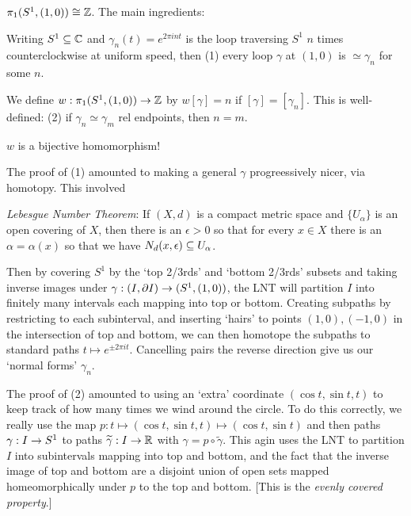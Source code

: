 \documentclass[12pt]{article}
\begin{document}
\msk

$\pi_1(S^1,(1,0))\cong{\mathbb Z}$. The main ingredients:

\ssk

Writing $S^1\subseteq{\mathbb C}$ and $\gamma_n(t)=e^{2\pi int}$ is the loop
traversing $S^1$ $n$ times counterclockwise at uniform speed,
then (1) every loop $\gamma$ at $(1,0)$ is $\simeq\gamma_n$ for some $n$.

\ssk

We define $w:\pi_1(S^1,(1,0))\rightarrow{\mathbb Z}$ by $w[\gamma] = n$ if
$[\gamma]=[\gamma_n]$. This is well-defined:
(2) if $\gamma_n\simeq\gamma_m$ rel endpoints, then $n=m$.

\ssk

$w$ is a bijective homomorphism!

\ssk

The proof of (1) amounted to making a general $\gamma$ progreessively nicer, 
via homotopy. This involved 

\ssk

{\it Lebesgue Number Theorem}: If $(X,d)$ is a compact metric space and
$\{U_\alpha\}$ is an open covering of $X$, then there is an $\epsilon>0$
so that for every $x\in X$ there is an $\alpha=\alpha(x)$ so that 
we have $N_d(x,\epsilon)\subseteq U_\alpha$.

\ssk

Then by covering $S^1$ by the `top 2/3rds' and `bottom 2/3rds' subsets
and taking inverse images under $\gamma:(I,\partial I)\rightarrow (S^1,(1,0))$,
the LNT will partition $I$ into finitely many intervals each mapping into
top or bottom. Creating subpaths by restricting to each subinterval, and inserting
`hairs' to points $(1,0),(-1,0)$ in the intersection of top and bottom,
we can then homotope the subpaths to standard paths $t\mapsto e^{\pm 2\pi it}$.
Cancelling pairs the reverse direction give us our `normal forms'
$\gamma_n$.

\ssk

The proof of (2) amounted to using an `extra' coordinate $(\cos t,\sin t,t)$
to keep track of how many times we wind around the circle. To do this correctly,
we really use the map $p:t\mapsto(\cos t,\sin t,t)\mapsto(\cos t,\sin t)$ and
then  paths $\gamma:I\rightarrow S^1$ to paths 
$\widetilde{\gamma}:I\rightarrow {\mathbb R}$ with $\gamma = p\circ\widetilde{\gamma}$. 
This agin uses the LNT to partition $I$ into subintervals mapping into top and bottom,
and the fact that the inverse image of top and bottom are a disjoint
union of open sets mapped homeomorphically under $p$ to the top and bottom.
[This is the {\it evenly covered property}.]
\end{document}
